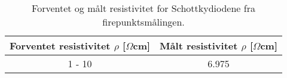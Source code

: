 \documentclass{article}
\begin{document}
    \begin{table}[ht]
        \centering
        \caption{Forventet og målt resistivitet for Schottkydiodene fra firepunktsmålingen.}
        \vspace{2mm}
        \label{tab:schottkyresistivitet}
        \begin{tabular}{|c|c|}
            \hline
            Forventet resistivitet $\rho$ [$\Omega$cm] & Målt resistivitet $\rho$ [$\Omega$cm]  \\
            \hline \hline
            1 - 10 & 6.975 \\
            \hline
        \end{tabular} \\
        \hspace{0pt}\\
    \end{table}
    \fi



\end{document}
